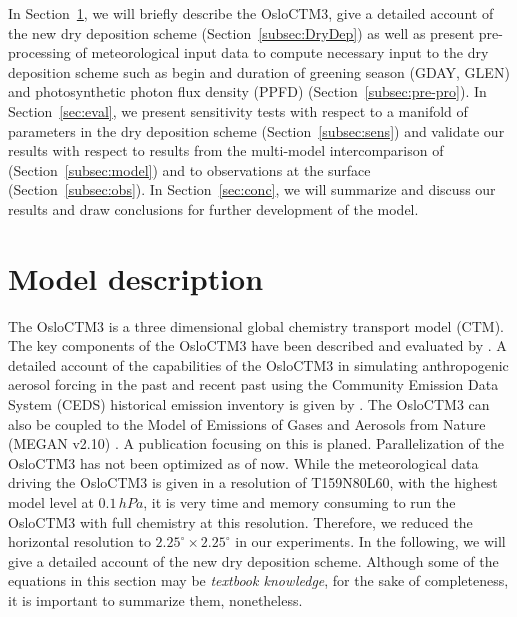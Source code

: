 \documentclass[gmd, manuscript]{copernicus}
\begin{document}
In Section~\ref{sec:model_des}, we will briefly describe the OsloCTM3, give a detailed account of the new dry deposition scheme (Section~\ref{subsec:DryDep}) as well as present pre-processing of meteorological input data to compute necessary input to the dry deposition scheme such as begin and duration of greening season (GDAY, GLEN) and photosynthetic photon flux density (PPFD) (Section~\ref{subsec:pre-pro}). In Section~\ref{sec:eval}, we present sensitivity tests with respect to a manifold of parameters in the dry deposition scheme (Section~\ref{subsec:sens}) and validate our results with respect to results from the multi-model intercomparison of \citet{ACP:Hardacre2015} (Section~\ref{subsec:model}) and to observations at the surface (Section~\ref{subsec:obs}). In Section~\ref{sec:conc}, we will summarize and discuss our results and draw conclusions for further development of the model.
\section{Model description}
\label{sec:model_des}
The OsloCTM3 is a three dimensional global chemistry transport model (CTM). The key components of the OsloCTM3 have been described and evaluated by \citet{GMD:Sovde2012}. A detailed account of the capabilities of the OsloCTM3 in simulating anthropogenic aerosol forcing in the past and recent past using the Community Emission Data System (CEDS) historical emission inventory \citep{GMD:Hoesly2018} is given by \citet{GMD:Lund2018}. The OsloCTM3 can also be coupled to the Model of Emissions of Gases and Aerosols from Nature (MEGAN v2.10) \citep{ACP:Guenther2006}. A publication focusing on this is planed. Parallelization of the OsloCTM3 has not been optimized as of now. While the meteorological data driving the OsloCTM3 is given in a resolution of T159N80L60, with the highest model level at $0.1\,\unit{hPa}$, it is very time and memory consuming to run the OsloCTM3 with full chemistry at this resolution. Therefore, we reduced the horizontal resolution to $2.25^\circ\times2.25^\circ$ in our experiments. In the following, we will give a detailed account of the new dry deposition scheme. Although some of the equations in this section may be \emph{textbook knowledge}, for the sake of completeness, it is important to summarize them, nonetheless.
\end{document}

